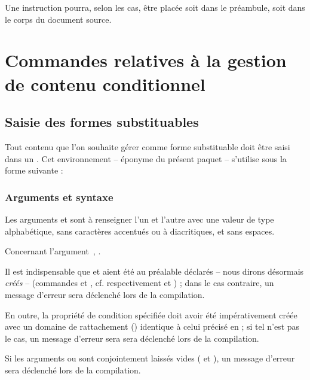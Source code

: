 \documentclass{article}
\begin{document}
Une instruction  pourra, selon les cas, être placée soit dans le préambule, soit dans le corps du document source.

\section{Commandes relatives à la gestion de contenu conditionnel}
\subsection{Saisie des formes substituables}\label{CtDoc_Commandes_CondiText}
Tout contenu que l'on souhaite gérer comme forme substituable doit être saisi dans un . Cet environnement -- éponyme du présent paquet -- s'utilise sous la forme suivante :


\subsubsection{Arguments et syntaxe}
Les arguments  et  sont à renseigner l'un et l'autre avec une valeur de type alphabétique, sans caractères accentués ou à diacritiques, et sans espaces.

Concernant l'argument~\val{*}, .

Il est indispensable que  et  aient été au préalable déclarés -- nous dirons désormais \emph{créés} -- (commandes  et , cf. respectivement  et ) ; dans le cas contraire, un message d'erreur sera déclenché lors de la compilation.

En outre, la propriété de condition spécifiée doit avoir été impérativement créée avec un domaine de rattachement () identique à celui précisé en  ; si tel n'est pas le cas, un message d'erreur sera sera déclenché lors de la compilation.

Si les arguments  ou  sont conjointement laissés vides (\argovoid{} et \argmvoid{}), un message d'erreur sera déclenché lors de la compilation.
\end{document}
